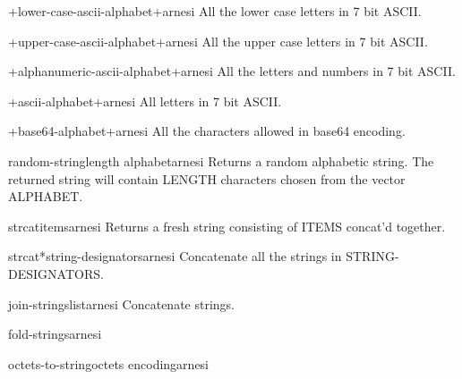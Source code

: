 \begin{constant}{+lower-case-ascii-alphabet+}{}{arnesi}{}
  All the lower case letters in 7 bit ASCII.
\end{constant}

\begin{constant}{+upper-case-ascii-alphabet+}{}{arnesi}{}
  All the upper case letters in 7 bit ASCII.
\end{constant}

\begin{constant}{+alphanumeric-ascii-alphabet+}{}{arnesi}{}
  All the letters and numbers in 7 bit ASCII.
\end{constant}

\begin{constant}{+ascii-alphabet+}{}{arnesi}{}
  All letters in 7 bit ASCII.
\end{constant}

\begin{constant}{+base64-alphabet+}{}{arnesi}{}
  All the characters allowed in base64 encoding.
\end{constant}

\begin{function}{random-string}{\op length alphabet}{arnesi}{}
  Returns a random alphabetic string. The returned string will contain
  LENGTH characters chosen from the vector ALPHABET.
\end{function}

\begin{function}{strcat}{\rest items}{arnesi}{}
  Returns a fresh string consisting of ITEMS concat'd together.
\end{function}

\begin{function}{strcat*}{string-designators}{arnesi}{}
  Concatenate all the strings in STRING-DESIGNATORS.
\end{function}

\begin{function}{join-strings}{list}{arnesi}{}
  Concatenate strings.
\end{function}

\begin{function}{fold-strings}{}{arnesi}{}
  
\end{function}

\begin{function}{octets-to-string}{octets encoding}{arnesi}{}
  
\end{function}

